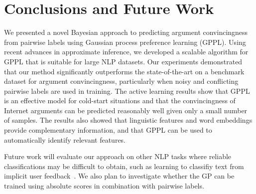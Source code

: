 \section{Conclusions and Future Work}

We presented a novel Bayesian approach to predicting argument convincingness from pairwise labels using
Gaussian process preference learning (GPPL).
Using recent advances in approximate inference, we developed a scalable algorithm for GPPL 
that is suitable for large NLP datasets.
Our experiments demonstrated that our method significantly outperforms the state-of-the-art
on a benchmark dataset for argument convincingness, 
particularly when noisy and conflicting pairwise labels are used in training.
The active learning results show that GPPL is an effective model 
for cold-start situations 
and that the convincingness of Internet arguments can be predicted reasonably well given only a small number of samples.
The results also showed that linguistic features and word embeddings provide complementary information,
and that GPPL can be used to automatically identify relevant features.

Future work will evaluate our approach on other NLP tasks 
where reliable classifications may be difficult to obtain, 
such as learning to classifiy text from implicit user feedback~\cite{joachims2002optimizing}.
We also plan to investigate whether the GP can be trained 
using absolute scores in combination with pairwise labels.
